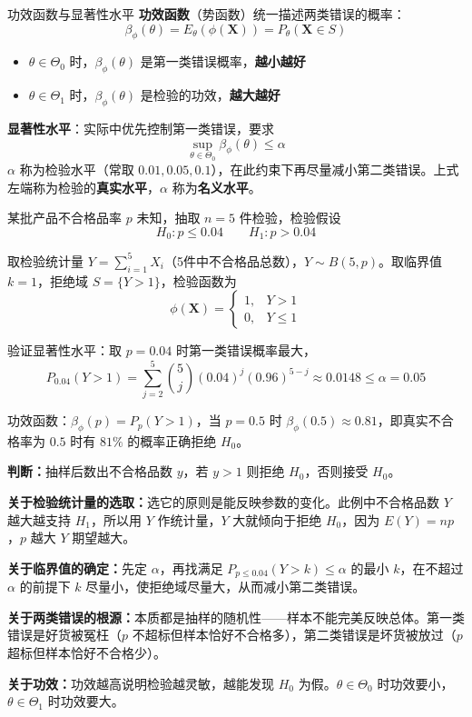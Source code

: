 \begin{definition}{功效函数与显著性水平}
\textbf{功效函数}（势函数）统一描述两类错误的概率：
$$\beta_\phi(\theta) = E_\theta(\phi(\boldsymbol{X})) = P_\theta(\boldsymbol{X} \in S)$$
\begin{itemize}
    \item $\theta \in \Theta_0$ 时，$\beta_\phi(\theta)$ 是第一类错误概率，\textbf{越小越好}
    \item $\theta \in \Theta_1$ 时，$\beta_\phi(\theta)$ 是检验的功效，\textbf{越大越好}
\end{itemize}

\textbf{显著性水平}：实际中优先控制第一类错误，要求
$$\sup_{\theta \in \Theta_0} \beta_\phi(\theta) \leq \alpha$$
$\alpha$ 称为检验水平（常取 $0.01, 0.05, 0.1$），在此约束下再尽量减小第二类错误。上式左端称为检验的\textbf{真实水平}，$\alpha$ 称为\textbf{名义水平}。
\end{definition}
\begin{example}
某批产品不合格品率 $p$ 未知，抽取 $n=5$ 件检验，检验假设
$$H_0: p \leq 0.04 \qquad H_1: p > 0.04$$

取检验统计量 $Y = \sum_{i=1}^5 X_i$（5件中不合格品总数），$Y \sim B(5,p)$。取临界值 $k=1$，拒绝域 $S = \{Y > 1\}$，检验函数为
$$\phi(\boldsymbol{X}) = \begin{cases} 1, & Y > 1 \\ 0, & Y \leq 1 \end{cases}$$

验证显著性水平：取 $p=0.04$ 时第一类错误概率最大，
$$P_{0.04}(Y>1) = \sum_{j=2}^{5}\binom{5}{j}(0.04)^j(0.96)^{5-j} \approx 0.0148 \leq \alpha = 0.05$$

功效函数：$\beta_\phi(p) = P_p(Y>1)$，当 $p=0.5$ 时 $\beta_\phi(0.5) \approx 0.81$，即真实不合格率为 $0.5$ 时有 $81\%$ 的概率正确拒绝 $H_0$。

\textbf{判断：}抽样后数出不合格品数 $y$，若 $y > 1$ 则拒绝 $H_0$，否则接受 $H_0$。
\end{example}

\begin{note}
\textbf{关于检验统计量的选取：}选它的原则是能反映参数的变化。此例中不合格品数 $Y$ 越大越支持 $H_1$，所以用 $Y$ 作统计量，$Y$ 大就倾向于拒绝 $H_0$，因为 $E(Y) = np$，$p$ 越大 $Y$ 期望越大。

\textbf{关于临界值的确定：}先定 $\alpha$，再找满足 $P_{p\leq 0.04}(Y>k)\leq\alpha$ 的最小 $k$，在不超过 $\alpha$ 的前提下 $k$ 尽量小，使拒绝域尽量大，从而减小第二类错误。

\textbf{关于两类错误的根源：}本质都是抽样的随机性——样本不能完美反映总体。第一类错误是好货被冤枉（$p$ 不超标但样本恰好不合格多），第二类错误是坏货被放过（$p$ 超标但样本恰好不合格少）。

\textbf{关于功效：}功效越高说明检验越灵敏，越能发现 $H_0$ 为假。$\theta\in\Theta_0$ 时功效要小，$\theta\in\Theta_1$ 时功效要大。
\end{note}

